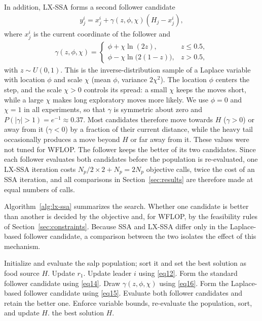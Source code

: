 \documentclass[journal,twoside]{IEEEtran}
\begin{document}
In addition, LX-SSA forms a second follower candidate
\begin{align}\label{eq15}
y_j^i=x_j^i+\gamma(z,\phi,\chi)\left(H_j-x_j^i\right),
\end{align}
where $x_j^i$ is the current coordinate of the follower and
\begin{align}\label{eq16}
\gamma(z,\phi,\chi)=
\begin{cases}
\phi+\chi\ln(2z), & z\le0.5,\\
\phi-\chi\ln\bigl(2(1-z)\bigr), & z>0.5,
\end{cases}
\end{align}
with $z\sim U(0,1)$. This is the inverse-distribution sample of a Laplace variable with location $\phi$ and scale $\chi$ (mean $\phi$, variance $2\chi^2$). The location $\phi$ centers the step, and the scale $\chi>0$ controls its spread: a small $\chi$ keeps the moves short, while a large $\chi$ makes long exploratory moves more likely. We use $\phi=0$ and $\chi=1$ in all experiments, so that $\gamma$ is symmetric about zero and $P(|\gamma|>1)=e^{-1}\approx0.37$. Most candidates therefore move towards $H$ ($\gamma>0$) or away from it ($\gamma<0$) by a fraction of their current distance, while the heavy tail occasionally produces a move beyond $H$ or far away from it. These values were not tuned for WFLOP. The follower keeps the better of its two candidates. Since each follower evaluates both candidates before the population is re-evaluated, one LX-SSA iteration costs $N_p/2\times2+N_p=2N_p$ objective calls, twice the cost of an SSA iteration, and all comparisons in Section~\ref{sec:results} are therefore made at equal numbers of calls.

Algorithm~\ref{alg:lx-ssa} summarizes the search. Whether one candidate is better than another is decided by the objective and, for WFLOP, by the feasibility rules of Section~\ref{sec:constraints}. Because SSA and LX-SSA differ only in the Laplace-based follower candidate, a comparison between the two isolates the effect of this mechanism.

\begin{algorithm}
\caption{Previously developed LX-SSA search logic~\cite{Solanki2023}}
\label{alg:lx-ssa}
\begin{algorithmic}[1]
\State Initialize and evaluate the salp population; sort it and set the best solution as food source $H$.
    \State Update $r_1$.
            \State Update leader $i$ using \eqref{eq12}.
        \Else
            \State Form the standard follower candidate using \eqref{eq14}.
            \State Draw $\gamma(z,\phi,\chi)$ using \eqref{eq16}.
            \State Form the Laplace-based follower candidate using \eqref{eq15}.
            \State Evaluate both follower candidates and retain the better one.
        \EndIf
    \EndFor
    \State Enforce variable bounds, re-evaluate the population, sort, and update $H$.
\EndWhile
\State \Return the best solution $H$.
\end{algorithmic}
\end{algorithm}
\end{document}
